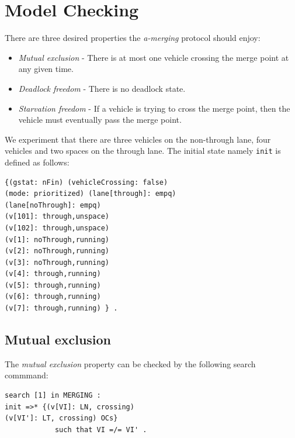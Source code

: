\documentclass[10pt, conference, compsocconf]{IEEEtran}
\begin{document}
 
\section{Model Checking}
\label{sect_model}
There are three desired properties the \textit{a-merging} protocol should enjoy:
\begin{itemize}
    \item \textit{Mutual exclusion} - There is at most one vehicle crossing the merge point at any given time.
    \item \textit{Deadlock freedom} - There is no deadlock state.
    \item \textit{Starvation freedom} - If a vehicle is trying to cross the merge point, then the vehicle must eventually pass the merge point.
\end{itemize}


We experiment that there are three vehicles on the non-through lane,
four vehicles and two spaces on the through lane.
The initial state namely \verb!init! is defined as follows:
\begin{small}
\begin{verbatim}
{(gstat: nFin) (vehicleCrossing: false) 
(mode: prioritized) (lane[through]: empq) 
(lane[noThrough]: empq) 
(v[101]: through,unspace) 
(v[102]: through,unspace)
(v[1]: noThrough,running) 
(v[2]: noThrough,running) 
(v[3]: noThrough,running)
(v[4]: through,running) 
(v[5]: through,running) 
(v[6]: through,running) 
(v[7]: through,running) } .
\end{verbatim}
\end{small}

\subsection{Mutual exclusion}

The \textit{mutual exclusion} property can be checked by the following search commmand:

\begin{small}
\begin{verbatim}
search [1] in MERGING : 
init =>* {(v[VI]: LN, crossing) 
(v[VI']: LT, crossing) OCs} 
            such that VI =/= VI' .
\end{verbatim}
\end{small}
\end{document}
